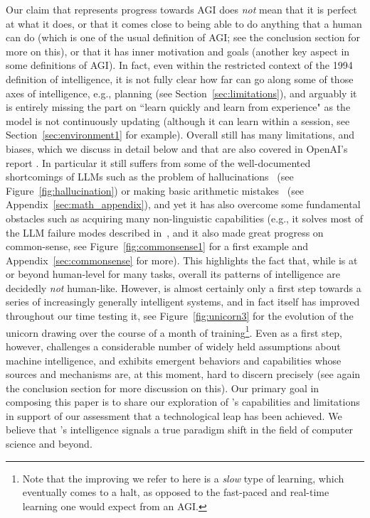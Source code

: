 Our claim that {\DV} represents progress towards AGI does {\em not} mean that it is perfect at what it does, or that it comes close to being able to do anything that a human can do (which is one of the usual definition of AGI; see the conclusion section for more on this), or that it has inner motivation and goals (another key aspect in some definitions of AGI). In fact, even within the restricted context of the 1994 definition of intelligence, it is not fully clear how far {\DV} can go along some of those axes of intelligence, e.g., planning (see Section~\ref{sec:limitations}), and arguably it is entirely missing the part on ``learn quickly and learn from experience" as the model is not continuously updating (although it can learn within a session, see Section~\ref{sec:environment1} for example).
Overall {\DV} still has many limitations, and biases, which we discuss in detail below and that are also covered in OpenAI's report \cite{gpt4}. In particular it still suffers from some of the well-documented shortcomings of LLMs such as the problem of hallucinations~\cite{maynez2020faithfulness} (see Figure~\ref{fig:hallucination}) or making basic arithmetic mistakes~\cite{cobbe2021training} (see Appendix~\ref{sec:math_appendix}), and yet it has also overcome some fundamental obstacles such as acquiring many non-linguistic capabilities (e.g., it solves most of the LLM failure modes described in~\cite{mahowald2023dissociating}, and it also made great progress on common-sense, see Figure~\ref{fig:commonsense1} for a first example and Appendix~\ref{sec:commonsense} for more). This highlights the fact that, while {\DV} is at or beyond human-level for many tasks, overall its patterns of intelligence are decidedly {\em not} human-like. However, {\DV} is almost certainly only a first step towards a series of increasingly generally intelligent systems, and in fact {\DV} itself has improved throughout our time testing it, see Figure~\ref{fig:unicorn3} for the evolution of the unicorn drawing over the course of a month of training\footnote{Note that the improving we refer to here is a {\em slow} type of learning, which eventually comes to a halt, as opposed to the fast-paced and real-time learning one would expect from an AGI.}. Even as a first step, however, {\DV} challenges a considerable number of widely held assumptions about machine intelligence, and exhibits emergent behaviors and capabilities whose sources and mechanisms are, at this moment, hard to discern precisely (see again the conclusion section for more discussion on this). 
Our primary goal in composing this paper is to share our exploration of {\DV}'s capabilities and limitations in support of our assessment that a technological leap has been achieved. We believe that {\DV}'s intelligence signals a true paradigm shift in the field of computer science and beyond. 


